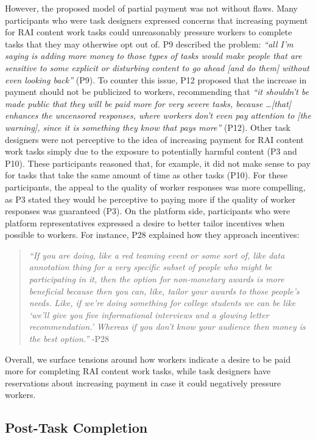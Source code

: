 However, the proposed model of partial payment was not without flaws. Many participants who were task designers expressed concerns that increasing payment for RAI content work tasks could unreasonably pressure workers to complete tasks that they may otherwise opt out of.  P9 described the problem: \textit{``all I'm saying is adding more money to those types of tasks would make people that are sensitive to some explicit or disturbing content to go ahead [and do them] without even looking back''} (P9). To counter this issue, P12 proposed that the increase in payment should not be publicized to workers, recommending that \textit{``it shouldn't be made public that they will be paid more for very severe tasks, because \dots [that] enhances the uncensored responses, where workers don't even pay attention to [the warning], since it is something they know that pays more''} (P12). Other task designers were not perceptive to the idea of increasing payment for RAI content work tasks simply due to the exposure to potentially harmful content (P3 and P10). These participants reasoned that, for example, it did not make sense to pay for tasks that take the same amount of time as other tasks (P10). For these participants, the appeal to the quality of worker responses was more compelling, as P3 stated they would be perceptive to paying more if the quality of worker responses was guaranteed (P3). On the platform side, participants who were platform representatives expressed a desire to better tailor incentives when possible to workers. For instance, P28 explained how they approach incentives:
\begin{quote}
    \textit{``If you are doing, like a red teaming event or some sort of, like data annotation thing for a very specific subset of people who might be participating in it, then the option for non-monetary awards is more beneficial because then you can, like, tailor your awards to those people's needs. Like, if we're doing something for college students we can be like `we'll give you five informational interviews and a glowing letter recommendation.' Whereas if you don't know your audience then money is the best option.''} -P28
\end{quote}
Overall, we surface tensions around how workers indicate a desire to be paid more for completing RAI content work tasks, while task designers have reservations about increasing payment in case it could negatively pressure workers. 


\subsection{Post-Task Completion}
